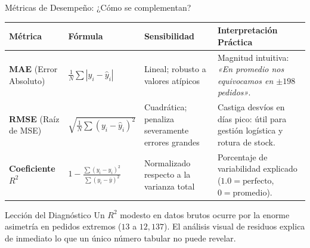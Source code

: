 \documentclass[10pt,aspectratio=169]{beamer}
\begin{document}
\begin{frame}{Métricas de Desempeño: ¿Cómo se complementan?}
  \begin{center}
    \scriptsize
    \begin{tabular}{p{2.8cm} p{3.2cm} p{3.2cm} p{3.5cm}}
      \toprule
      \textbf{Métrica} & \textbf{Fórmula} & \textbf{Sensibilidad} & \textbf{Interpretación Práctica} \\
      \midrule
      \textbf{MAE} (Error Absoluto) &
      $\frac{1}{N}\sum |y_i - \hat{y}_i|$ &
      Lineal; robusto a valores atípicos &
      Magnitud intuitiva: \textit{«En promedio nos equivocamos en $\pm 198$ pedidos»}. \\
      \addlinespace
      \textbf{RMSE} (Raíz de MSE) &
      $\sqrt{\frac{1}{N}\sum (y_i - \hat{y}_i)^2}$ &
      Cuadrática; penaliza severamente errores grandes &
      Castiga desvíos en días pico: útil para gestión logística y rotura de stock. \\
      \addlinespace
      \textbf{Coeficiente $R^2$} &
      $1 - \frac{\sum (y_i - \hat{y}_i)^2}{\sum (y_i - \bar{y})^2}$ &
      Normalizado respecto a la varianza total &
      Porcentaje de variabilidad explicado ($1.0 = \text{perfecto}$, $0 = \text{promedio}$). \\
      \bottomrule
    \end{tabular}
  \end{center}

  \vspace{0.2cm}
  \begin{alertblock}{Lección del Diagnóstico}
    \scriptsize
    Un $R^2$ modesto en datos brutos ocurre por la enorme asimetría en pedidos extremos ($13$ a $12,137$).
    El análisis visual de residuos explica de inmediato lo que un único número tabular no puede revelar.
  \end{alertblock}
\end{frame}
\end{document}

